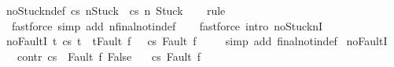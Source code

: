 \begin{isabellebody}
\isamarkupfalse%
\ noStuckn{\isacharunderscore}def{\isacharprime}{\isacharcolon}\ {\isachardoublequoteopen}{\isasymGamma}{\isasymturnstile}{\isasymlangle}c{\isacharcomma}s{\isasymrangle}\ {\isacharequal}n{\isasymRightarrow}{\isasymnotin}{\isacharbraceleft}Stuck{\isacharbraceright}\ {\isacharequal}\ {\isacharparenleft}{\isasymnot}{\isasymGamma}{\isasymturnstile}{\isasymlangle}c{\isacharcomma}s{\isasymrangle}\ {\isacharequal}n{\isasymRightarrow}\ Stuck{\isacharparenright}{\isachardoublequoteclose}\isanewline
%
\isadelimproof
\ \ %
\endisadelimproof
%
\isatagproof
{}\isamarkupfalse%
\ rule\isanewline
\ \ \isamarkupfalse%
\ \ {\isacharparenleft}fastforce\ simp\ add{\isacharcolon}\ nfinal{\isacharunderscore}notin{\isacharunderscore}def{\isacharparenright}\isanewline
\ \ \isamarkupfalse%
\ {\isacharparenleft}fastforce\ intro{\isacharcolon}\ noStucknI{\isacharprime}{\isacharparenright}\isanewline
\ \ \isamarkupfalse%
%
\endisatagproof
{\isafoldproof}%
%
\isadelimproof
\isanewline
%
\endisadelimproof
\isanewline
\isanewline
{}\isamarkupfalse%
\ noFaultI{\isacharcolon}\ {\isachardoublequoteopen}{\isasymlbrakk}{\isasymAnd}t{\isachardot}\ {\isasymGamma}{\isasymturnstile}{\isasymlangle}c{\isacharcomma}s{\isasymrangle}\ {\isasymRightarrow}t\ {\isasymLongrightarrow}\ t{\isasymnoteq}Fault\ f{\isasymrbrakk}\ {\isasymLongrightarrow}\ \ {\isasymGamma}{\isasymturnstile}{\isasymlangle}c{\isacharcomma}s{\isasymrangle}\ {\isasymRightarrow}{\isasymnotin}{\isacharbraceleft}Fault\ f{\isacharbraceright}{\isachardoublequoteclose}\ \isanewline
%
\isadelimproof
\ \ %
\endisadelimproof
%
\isatagproof
{}\isamarkupfalse%
\ {\isacharparenleft}simp\ add{\isacharcolon}\ final{\isacharunderscore}notin{\isacharunderscore}def{\isacharparenright}%
\endisatagproof
{\isafoldproof}%
%
\isadelimproof
\isanewline
%
\endisadelimproof
\isanewline
{}\isamarkupfalse%
\ noFaultI{\isacharprime}{\isacharcolon}\ \isanewline
\ \ \ contr{\isacharcolon}\ {\isachardoublequoteopen}{\isasymGamma}{\isasymturnstile}{\isasymlangle}c{\isacharcomma}s{\isasymrangle}\ {\isasymRightarrow}\ Fault\ f{\isasymLongrightarrow}\ False{\isachardoublequoteclose}\isanewline
\ \ \ {\isachardoublequoteopen}{\isasymGamma}{\isasymturnstile}{\isasymlangle}c{\isacharcomma}s{\isasymrangle}\ {\isasymRightarrow}{\isasymnotin}{\isacharbraceleft}Fault\ f{\isacharbraceright}{\isachardoublequoteclose}\isanewline
%
\isadelimproof
\ \ %
\endisadelimproof
%
\isatagproof
{}\isamarkupfalse%

\end{isabellebody}
